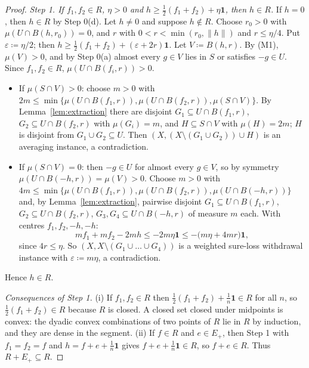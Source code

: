 \documentclass[11pt]{article}
\theoremstyle{definition}
\newcommand{\one}{\mathbf 1}
\begin{document}
\begin{proof}
\emph{Step 1. If $f_1,f_2\in R$, $\eta>0$ and $h\ge\frac12(f_1+f_2)+\eta\one$, then $h\in R$.} If $h=0$, then $h\in R$ by Step 0(d). Let $h\ne0$ and suppose $h\notin R$. Choose $r_0>0$ with $\mu(U\cap B(h,r_0))=0$, and $r$ with $0<r<\min(r_0,\|h\|)$ and $r\le\eta/4$. Put $\varepsilon\coloneqq\eta/2$; then $h\ge\frac12(f_1+f_2)+(\varepsilon+2r)\one$. Let $V\coloneqq B(h,r)$. By (M1), $\mu(V)>0$, and by Step 0(a) almost every $g\in V$ lies in $S$ or satisfies $-g\in U$. Since $f_1,f_2\in R$, $\mu(U\cap B(f_i,r))>0$.
\begin{itemize}
\item If $\mu(S\cap V)>0$: choose $m>0$ with $2m\le\min\{\mu(U\cap B(f_1,r)),\mu(U\cap B(f_2,r)),\mu(S\cap V)\}$. By Lemma~\ref{lem:extraction} there are disjoint $G_1\subseteq U\cap B(f_1,r)$, $G_2\subseteq U\cap B(f_2,r)$ with $\mu(G_i)=m$, and $H\subseteq S\cap V$ with $\mu(H)=2m$; $H$ is disjoint from $G_1\cup G_2\subseteq U$. Then $(X,(X\setminus(G_1\cup G_2))\cup H)$ is an averaging instance, a contradiction.
\item If $\mu(S\cap V)=0$: then $-g\in U$ for almost every $g\in V$, so by symmetry $\mu(U\cap B(-h,r))=\mu(V)>0$. Choose $m>0$ with $4m\le\min\{\mu(U\cap B(f_1,r)),\mu(U\cap B(f_2,r)),\mu(U\cap B(-h,r))\}$ and, by Lemma~\ref{lem:extraction}, pairwise disjoint $G_1\subseteq U\cap B(f_1,r)$, $G_2\subseteq U\cap B(f_2,r)$, $G_3,G_4\subseteq U\cap B(-h,r)$ of measure $m$ each. With centres $f_1,f_2,-h,-h$:
\[
m f_1+mf_2-2mh\le-2m\eta\one\le-\bigl(m\eta+4mr\bigr)\one,
\]
since $4r\le\eta$. So $(X,X\setminus(G_1\cup\dots\cup G_4))$ is a weighted sure-loss withdrawal instance with $\varepsilon\coloneqq m\eta$, a contradiction.
\end{itemize}
Hence $h\in R$.

\emph{Consequences of Step 1.} (i) If $f_1,f_2\in R$ then $\frac12(f_1+f_2)+\frac1n\one\in R$ for all $n$, so $\frac12(f_1+f_2)\in R$ because $R$ is closed. A closed set closed under midpoints is convex: the dyadic convex combinations of two points of $R$ lie in $R$ by induction, and they are dense in the segment. (ii) If $f\in R$ and $e\in E_+$, then Step 1 with $f_1=f_2=f$ and $h=f+e+\frac1n\one$ gives $f+e+\frac1n\one\in R$, so $f+e\in R$. Thus $R+E_+\subseteq R$.


\end{proof}
\end{document}
